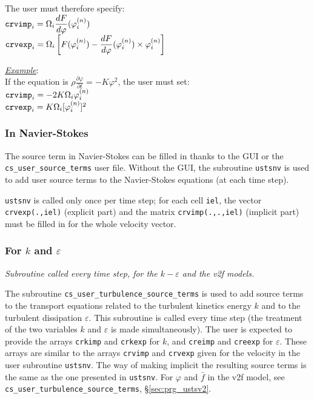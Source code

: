 {{{The user must therefore specify:\\
$\displaystyle\text{\texttt{crvimp}}_i=\Omega_i\frac{dF}{d\varphi}(\varphi_i^{(n)})$\\
$\displaystyle\text{\texttt{crvexp}}_i=
\Omega_i\left[F(\varphi_i^{(n)})-\frac{dF}{d\varphi}(\varphi_i^{(n)})\times\varphi_i^{(n)}\right]$

\underline{\em Example}:\\
If the equation is
$\displaystyle \rho\frac{\partial\varphi}{\partial t}=-K\varphi^2$,
the user must set:\\
$\text{\texttt{crvimp}}_i=-2K\Omega_i\varphi_i^{(n)}$\\
$\text{\texttt{crvexp}}_i=K\Omega_i[\varphi_i^{(n)}]^2$

\subsubsection{In Navier-Stokes}

The source term in Navier-Stokes can be filled in thanks to the GUI or the
\texttt{cs\_user\_source\_terms} user file.
Without the GUI, the subroutine \texttt{ustsnv} is used to
add user source terms to the Navier-Stokes equations (at each time step).

\texttt{ustsnv} is called only once per time step; for each cell \texttt{iel},
the vector \texttt{crvexp(.,iel)} (explicit part) and the matrix \texttt{crvimp(.,.,iel)}
(implicit part) must be filled in for the whole velocity vector.


\subsubsection{For $k$ and $\varepsilon$}

\noindent
\textit{Subroutine called every time step, for the $k-\varepsilon$ and
the v2f models.}

The subroutine \texttt{cs\_user\_turbulence\_source\_terms} is used to add source terms to the transport equations
related to the turbulent kinetics energy $k$ and to the turbulent
dissipation $\varepsilon$.
This subroutine is called every time step (the
treatment of the two variables $k$ and $\varepsilon$ is made
simultaneously). The user is expected to provide the arrays \texttt{crkimp} and
\texttt{crkexp} for $k$, and \texttt{creimp} and \texttt{creexp} for
$\varepsilon$. These arrays are similar to the arrays \texttt{crvimp} and
\texttt{crvexp} given for the velocity in the user subroutine \texttt{ustsnv}.
The way of making implicit the resulting source terms is the same as the one
presented in \texttt{ustsnv}. For $\varphi$ and $\bar{f}$
in the v2f model, see \texttt{cs\_user\_turbulence\_source\_terms}, \S\ref{sec:prg_ustsv2}.

}}}
